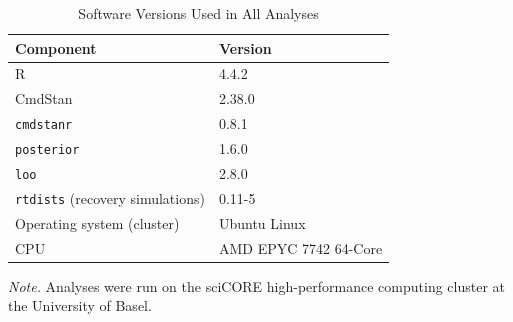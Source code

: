 \documentclass[man,floatsintext]{apa7}
\begin{document}
\begin{table}[!htbp]
\centering
\begin{threeparttable}
\caption{Software Versions Used in All Analyses}
\label{tab:software}
\begin{tabularx}{\textwidth}{lX}
\toprule
\textbf{Component} & \textbf{Version} \\
\midrule
R & 4.4.2 \\
CmdStan & 2.38.0 \\
\texttt{cmdstanr} & 0.8.1 \\
\texttt{posterior} & 1.6.0 \\
\texttt{loo} & 2.8.0 \\
\texttt{rtdists} (recovery simulations) & 0.11-5 \\
Operating system (cluster) & Ubuntu Linux \\
CPU & AMD EPYC 7742 64-Core \\
\bottomrule
\end{tabularx}
\begin{tablenotes}[flushleft]
\small
\item \textit{Note.} Analyses were run on the sciCORE high-performance computing cluster at the University of Basel.
\end{tablenotes}
\end{threeparttable}
\end{table}

\nocite{vehtari_loo_2024}

\clearpage
\printbibliography
\end{document}
